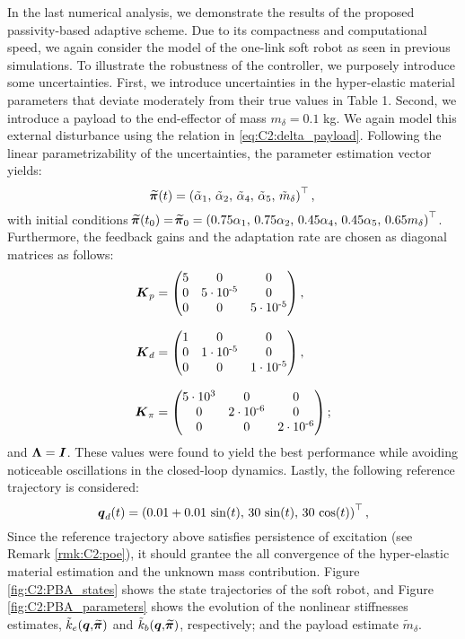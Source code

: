 In the last numerical analysis, we demonstrate the results of the proposed passivity-based adaptive scheme. Due to its compactness and computational speed, we again consider the model of the one-link soft robot as seen in previous simulations. To illustrate the robustness of the controller, we purposely introduce some uncertainties. First, we introduce uncertainties in the hyper-elastic material parameters that deviate moderately from their true values in Table 1. Second, we introduce a payload to the end-effector of mass $m_\delta = 0.1$ kg. We again model this external disturbance using the relation in \eqref{eq:C2:delta_payload}. Following the linear parametrizability of the uncertainties, the parameter estimation vector yields:
%
\begin{equation}
\widetilde{\!\boldsymbol{\pi}}(t) = \left( \tilde{\alpha}_1,\,\tilde{\alpha}_2,\,\tilde{\alpha}_4,\, \tilde{\alpha}_5,\, \tilde{m}_\delta\right)^\top,
\end{equation}
%
with initial conditions $\widetilde{\!\boldsymbol{\pi}}(t_0) = \widetilde{\!\boldsymbol{\pi}}_0 = \left(0.75 {\alpha}_1,\,0.75{\alpha}_2,\,0.45{\alpha}_4,\, 0.45{\alpha}_5,\, 0.65{m}_\delta\right)^\top$. Furthermore, the feedback gains and the adaptation rate are chosen as diagonal matrices as follows:
%
\begin{align*}
\boldsymbol{K}_p & = \begin{pmatrix} 
  5 & 0 & 0\\
  0 & 5\cdot10^{\textrm{-5}}& 0 \\ 
  0 & 0 & 5\cdot10^{\textrm{-5}}
\end{pmatrix}, \\[0.75em]
\boldsymbol{K}_d & = \begin{pmatrix} 
  1 & 0 & 0\\
  0 & 1\cdot10^{\textrm{-5}}& 0 \\ 
  0 & 0 & 1\cdot10^{\textrm{-5}}
\end{pmatrix}, \\[0.75em]
\boldsymbol{K}_\pi & = \begin{pmatrix} 
  5\cdot10^{\textrm{3}} & 0 & 0\\
  0 & 2\cdot10^{\textrm{-6}}& 0 \\ 
  0 & 0 & 2\cdot10^{\textrm{-6}}
\end{pmatrix};
\end{align*}
%
and $\boldsymbol{\Lambda} = \boldsymbol{I}$. These values were found to yield the best performance while avoiding noticeable oscillations in the closed-loop dynamics. Lastly, the following reference trajectory is considered:
%
\begin{equation}
{\boldsymbol{q}}_d(t) = \left(0.01 + 0.01\,\sin(t),\, 30 \,\sin(t),\, 30 \,\cos(t)\right)^\top,
\end{equation}
%
Since the reference trajectory above satisfies persistence of excitation (see Remark \ref{rmk:C2:poe}), it should grantee the all convergence of the hyper-elastic material estimation and the unknown mass contribution. Figure \ref{fig:C2:PBA_states} shows the state trajectories of the soft robot, and Figure \ref{fig:C2:PBA_parameters} shows the evolution of the nonlinear stiffnesses estimates, $\tilde{k}_e({\boldsymbol{q}},\widetilde{\!\boldsymbol{\pi}})$ and $\tilde{k}_b({\boldsymbol{q}},\widetilde{\!\boldsymbol{\pi}})$, respectively; and the payload estimate $\tilde{m}_\delta$.

